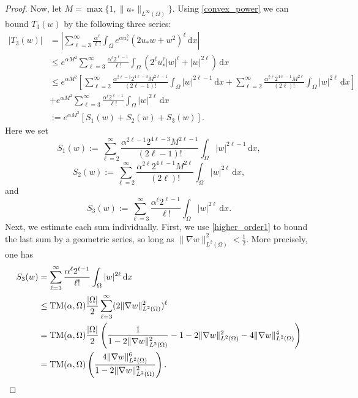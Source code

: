 \documentclass[reqno,11pt]{amsart}
\theoremstyle{definition}
\newcommand{\ud}{\,\mathrm{d}}
\begin{document}
\begin{proof}
    \noindent Now, let $M = \max \{ 1, \| u_*\|_{L^\infty (\Omega)} \}$. Using \eqref{convex_power}
    we can bound $T_3(w)$ by the following three series: 
    \begin{align} \label{higher_order3} 
    |T_3(w)| & =  \left | \sum_{\ell=3}^\infty \frac{\alpha^\ell}{\ell !} \int_\Omega 
    e^{\alpha u_*^2} (2u_* w + w^2)^{\ell} \ud x \right | \\ \nonumber 
    & \leq  e^{\alpha M^2} \sum_{\ell=3}^\infty  \frac{\alpha^\ell 2^{\ell-1}}{\ell !} 
    \int_\Omega (2^\ell u_*^\ell |w|^\ell + |w|^{2\ell} ) \ud x \\ \nonumber 
    & \leq e^{\alpha M^2} \left [ \sum_{\ell=2}^\infty \frac{\alpha^{2\ell-1} 2^{4\ell-3} M^{2\ell-1} }
    {(2\ell-1) !} \int_\Omega |w|^{2\ell-1} \ud x + \sum_{\ell=2}^\infty \frac{\alpha^{2\ell} 2^{4\ell-1}
    M^{2\ell} }{(2\ell)!} \int_\Omega |w|^{2\ell} \ud x  \right ] \\ \nonumber 
    &+ e^{\alpha M^2} \sum_{\ell=3}^\infty \frac{\alpha^\ell 2^{\ell-1}}{\ell !}
    \int_\Omega |w|^{2\ell} \ud x\\ \nonumber 
    &:= e^{\alpha M^2} [S_1(w)+ S_2(w)+S_3(w)]. 
    \end{align} 
    Here we set
    \[
    S_1(w):= \sum_{\ell=2}^\infty \frac{\alpha^{2\ell-1} 2^{4\ell-3} M^{2\ell-1} }
    {(2\ell-1) !} \int_\Omega |w|^{2\ell-1} \ud x,
    \]
    \[
    S_2(w):=\sum_{\ell = 2}^\infty \frac{\alpha^{2\ell} 2^{4\ell-1}M^{2\ell} }{(2\ell)!}
    \int_\Omega |w|^{2\ell} \ud x,
    \]
    and
    \[
    S_3(w):=\sum_{\ell=3}^\infty \frac{\alpha^\ell 2^{\ell-1}}{\ell !}
    \int_\Omega |w|^{2\ell} \ud x.
    \]
    \noindent Next, we estimate each sum individually. First, we use \eqref{higher_order1} to bound the 
    last sum by a geometric series, so long as 
    $\| \nabla w \|_{L^2(\Omega)}^2 < \frac{1}{2} .$
    More precisely, one has
    \begin{align*} 
    S_3(w) & = \sum_{\ell=3}^\infty \frac{\alpha^\ell 2^{\ell-1}}{\ell !}
    \int_\Omega |w|^{2\ell} \ud x \\ \nonumber 
    & \leq {\rm TM}(\alpha,\Omega) \frac{|\Omega |}{2} \sum_{\ell=3}^\infty(2\| 
    \nabla w\|_{L^2(\Omega)}^2)^\ell \\ \nonumber 
    & = {\rm TM}(\alpha,\Omega)\frac{|\Omega|}{2} \left ( \frac{1}{1-2\|\nabla w\|_{L^2(\Omega)}^2}
    - 1 - 2\| \nabla w\|_{L^2(\Omega)}^2 - 4\| \nabla w\|_{L^2(\Omega)}^4 \right ) \\ \nonumber 
    & = {\rm TM}(\alpha,\Omega)\left(\frac{4\| \nabla w \|_{L^2(\Omega)}^6}{1-2\| \nabla w \|_{L^2(\Omega)}^2}\right). 

\end{align*}
\end{proof}
\end{document}
